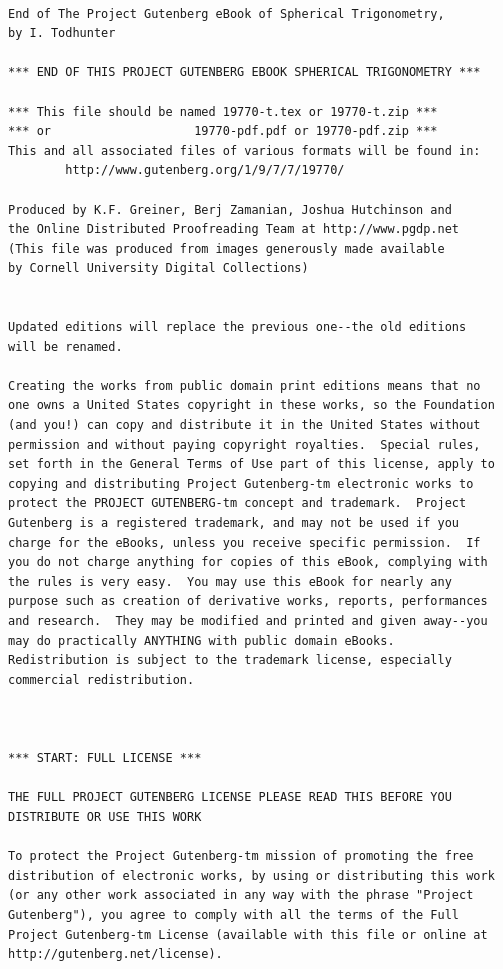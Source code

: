 \documentclass{book}[2004/02/16]
\begin{document}
\newpage
\pagestyle{empty}

\small
{}
\begin{verbatim}

End of The Project Gutenberg eBook of Spherical Trigonometry,
by I. Todhunter

*** END OF THIS PROJECT GUTENBERG EBOOK SPHERICAL TRIGONOMETRY ***

*** This file should be named 19770-t.tex or 19770-t.zip ***
*** or                    19770-pdf.pdf or 19770-pdf.zip ***
This and all associated files of various formats will be found in:
        http://www.gutenberg.org/1/9/7/7/19770/

Produced by K.F. Greiner, Berj Zamanian, Joshua Hutchinson and 
the Online Distributed Proofreading Team at http://www.pgdp.net 
(This file was produced from images generously made available 
by Cornell University Digital Collections)


Updated editions will replace the previous one--the old editions
will be renamed.

Creating the works from public domain print editions means that no
one owns a United States copyright in these works, so the Foundation
(and you!) can copy and distribute it in the United States without
permission and without paying copyright royalties.  Special rules,
set forth in the General Terms of Use part of this license, apply to
copying and distributing Project Gutenberg-tm electronic works to
protect the PROJECT GUTENBERG-tm concept and trademark.  Project
Gutenberg is a registered trademark, and may not be used if you
charge for the eBooks, unless you receive specific permission.  If
you do not charge anything for copies of this eBook, complying with
the rules is very easy.  You may use this eBook for nearly any
purpose such as creation of derivative works, reports, performances
and research.  They may be modified and printed and given away--you
may do practically ANYTHING with public domain eBooks.
Redistribution is subject to the trademark license, especially
commercial redistribution.



*** START: FULL LICENSE ***

THE FULL PROJECT GUTENBERG LICENSE PLEASE READ THIS BEFORE YOU
DISTRIBUTE OR USE THIS WORK

To protect the Project Gutenberg-tm mission of promoting the free
distribution of electronic works, by using or distributing this work
(or any other work associated in any way with the phrase "Project
Gutenberg"), you agree to comply with all the terms of the Full
Project Gutenberg-tm License (available with this file or online at
http://gutenberg.net/license).



\end{verbatim}
\end{document}
